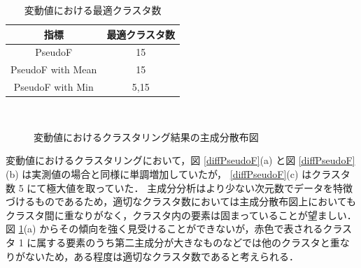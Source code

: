 \documentclass[a4j]{jarticle}
\begin{document}
\begin{table}[tb]
\centering
\caption{変動値における最適クラスタ数}
\label{diffPseudoFresult}
\begin{tabular}{|c|c|}
\hline
指標&最適クラスタ数\\
\hline
PseudoF&15\\
\hline
PseudoF with Mean&15\\
\hline
PseudoF with Min&5,15\\
\hline
\end{tabular}
\end{table}

\begin{figure}[tb]
\begin{center}
~
\caption{変動値におけるクラスタリング結果の主成分散布図}
\label{diffPseudoFresultPlot}
\end{center}
\end{figure}

変動値におけるクラスタリングにおいて，図 \ref{diffPseudoF}(a) と図 \ref{diffPseudoF}(b) は実測値の場合と同様に単調増加していたが， \ref{diffPseudoF}(c) はクラスタ数 5 にて極大値を取っていた．
主成分分析はより少ない次元数でデータを特徴づけるものであるため，適切なクラスタ数においては主成分散布図上においてもクラスタ間に重なりがなく，クラスタ内の要素は固まっていることが望ましい．図 \ref{diffPseudoFresultPlot}(a) からその傾向を強く見受けることができないが，赤色で表されるクラスタ 1 に属する要素のうち第二主成分が大きなものなどでは他のクラスタと重なりがないため，ある程度は適切なクラスタ数であると考えられる．
\end{document}

